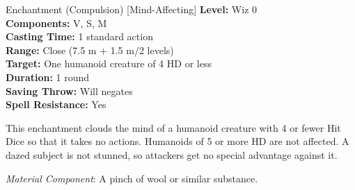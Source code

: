 {Enchantment (Compulsion) [Mind-Affecting]}
{
	\textbf{Level:}
	Wiz 0\\
	\textbf{Components:}
	V, S, M\\
	\textbf{Casting Time:}
	1 standard action\\
	\textbf{Range:}
	Close (7.5 m + 1.5 m/2 levels)\\
	\textbf{Target:}
	One humanoid creature of 4 HD or less\\
	\textbf{Duration:}
	1 round\\
	\textbf{Saving Throw:}
	Will negates\\
	\textbf{Spell Resistance:}
	Yes\\
}
{
	This enchantment clouds the mind of a humanoid creature with 4 or fewer Hit Dice so that it takes no actions. Humanoids of 5 or more HD are not affected. A dazed subject is not stunned, so attackers get no special advantage against it.

	\textit{Material Component}:
	A pinch of wool or similar substance.

}

